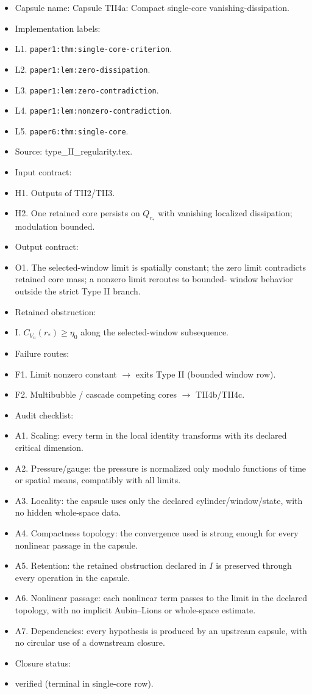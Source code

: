 \documentclass[11pt]{amsart}
\begin{document}
\begin{itemize}
  \item Capsule name: Capsule TII4a: Compact single-core vanishing-dissipation.
  \item Implementation labels:
  \item L1. \texttt{paper1:thm:single-core-criterion}.
  \item L2. \texttt{paper1:lem:zero-dissipation}.
  \item L3. \texttt{paper1:lem:zero-contradiction}.
  \item L4. \texttt{paper1:lem:nonzero-contradiction}.
  \item L5. \texttt{paper6:thm:single-core}.
  \item Source: type\_II\_regularity.tex.
  \item Input contract:
  \item H1. Outputs of TII2/TII3.
  \item H2. One retained core persists on $Q_{r_*}$ with vanishing localized dissipation; modulation bounded.
  \item Output contract:
  \item O1. The selected-window limit is spatially constant; the zero limit contradicts retained core mass; a nonzero limit reroutes to bounded- window behavior outside the strict Type II branch.
  \item Retained obstruction:
  \item I. $C_{V_n}(r_*)\ge \eta_0$ along the selected-window subsequence.
  \item Failure routes:
  \item F1. Limit nonzero constant $\to$ exits Type II (bounded window row).
  \item F2. Multibubble / cascade competing cores $\to$ TII4b/TII4c.
  \item Audit checklist:
  \item A1. Scaling: every term in the local identity transforms with its declared critical dimension.
  \item A2. Pressure/gauge: the pressure is normalized only modulo functions of time or spatial means, compatibly with all limits.
  \item A3. Locality: the capsule uses only the declared cylinder/window/state, with no hidden whole-space data.
  \item A4. Compactness topology: the convergence used is strong enough for every nonlinear passage in the capsule.
  \item A5. Retention: the retained obstruction declared in $I$ is preserved through every operation in the capsule.
  \item A6. Nonlinear passage: each nonlinear term passes to the limit in the declared topology, with no implicit Aubin--Lions or whole-space estimate.
  \item A7. Dependencies: every hypothesis is produced by an upstream capsule, with no circular use of a downstream closure.
  \item Closure status:
  \item verified (terminal in single-core row).
\end{itemize}
\end{document}
